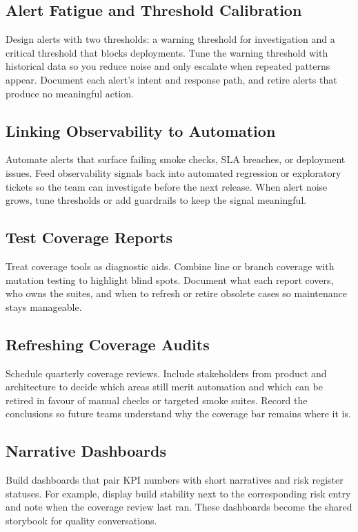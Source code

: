 \subsection{Alert Fatigue and Threshold Calibration}

Design alerts with two thresholds: a warning threshold for investigation and a critical threshold that blocks deployments. Tune the warning threshold with historical data so you reduce noise and only escalate when repeated patterns appear. Document each alert’s intent and response path, and retire alerts that produce no meaningful action.

\subsection{Linking Observability to Automation}

Automate alerts that surface failing smoke checks, SLA breaches, or deployment issues. Feed observability signals back into automated regression or exploratory tickets so the team can investigate before the next release. When alert noise grows, tune thresholds or add guardrails to keep the signal meaningful.

\subsection{Test Coverage Reports}

Treat coverage tools as diagnostic aids. Combine line or branch coverage with mutation testing to highlight blind spots. Document what each report covers, who owns the suites, and when to refresh or retire obsolete cases so maintenance stays manageable.

\subsection{Refreshing Coverage Audits}

Schedule quarterly coverage reviews. Include stakeholders from product and architecture to decide which areas still merit automation and which can be retired in favour of manual checks or targeted smoke suites. Record the conclusions so future teams understand why the coverage bar remains where it is.

\subsection{Narrative Dashboards}

Build dashboards that pair KPI numbers with short narratives and risk register statuses. For example, display build stability next to the corresponding risk entry and note when the coverage review last ran. These dashboards become the shared storybook for quality conversations.


